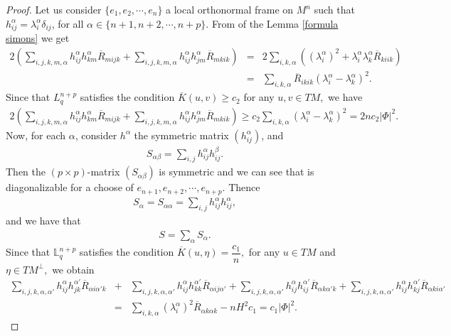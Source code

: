 \documentclass[leqno,11pt]{amsart}
\theoremstyle{plain}
\theoremstyle{definition}
\numberwithin{equation}{section}
\begin{document}
\begin{proof}

Let us consider $\{e_1,e_2,\cdots,e_{n}\}$ a local orthonormal frame on $M^{n}$ such that $h_{ij}^{\alpha}=\lambda_i^{\alpha}\delta_{ij}$, for all $\alpha\in \{n+1,n+2,\cdots,n+p\}.$ From of the Lemma \ref{formula simons} we get
\begin{eqnarray*}
2\left(\sum_{i,j,k,m,\alpha}h_{ij}^{\alpha}h_{km}^{\alpha}\overline{R}_{mijk}+\sum_{i,j,k,m,\alpha}h_{ij}^{\alpha}h_{jm}^{\alpha}\overline{R}_{mkik}\right)
&=&2\sum_{i,k,\alpha}\left((\lambda_{i}^{\alpha})^2+\lambda_i^{\alpha}\lambda_k^{\alpha}\overline{R}_{kiik}\right)\\
&=&\sum_{i,k,\alpha}\overline{R}_{ikik}\left(\lambda_i^{\alpha}-\lambda_k^{\alpha}\right)^2.
\end{eqnarray*}
Since that $L_{q}^{n+p}$ satisfies the condition $\overline{K}(u,v)\geq c_2$ for any $u,v\in TM,$ we have
\begin{eqnarray*}
2\left(\sum_{i,j,k,m,\alpha}h_{ij}^{\alpha}h_{km}^{\alpha}\overline{R}_{mijk}+\sum_{i,j,k,m,\alpha}h_{ij}^{\alpha}h_{jm}^{\alpha}\overline{R}_{mkik}\right)\geq c_2\sum_{i,k,\alpha}(\lambda_i^{\alpha}-\lambda_k^{\alpha})^2=2nc_2|\Phi|^2.
\end{eqnarray*}
Now, for each $\alpha$, consider $h^{\alpha}$ the symmetric matrix $(h_{ij}^{\alpha})$, and 
\begin{eqnarray*}
S_{\alpha\beta}=\sum_{i,j}h_{ij}^{\alpha}h_{ij}^{\beta}.
\end{eqnarray*}
Then the $(p\times p)$-matrix $(S_{\alpha\beta})$ is symmetric and we can see that is diagonalizable for a choose of $e_{n+1},e_{n+2},\cdots,e_{n+p}.$ Thence 
\begin{eqnarray*}
S_{\alpha}=S_{\alpha\alpha}=\sum_{i,j}h_{ij}^{\alpha}h_{ij}^{\alpha},
\end{eqnarray*}
and we have that 
\begin{eqnarray*}
S=\sum_{\alpha}S_{\alpha}.
\end{eqnarray*}
Since that $\mathbb{L}_{q}^{n+p}$ satisfies the condition $\overline{K}(u,\eta)=\dfrac{c_1}{n},$ for any $u\in TM$ and $\eta\in TM^{\perp},$ we obtain
\begin{eqnarray*}
\sum_{i,j,k,\alpha,\alpha'}h_{ij}^{\alpha}h_{jk}^{\alpha'}\overline{R}_{\alpha i\alpha' k}&+&\sum_{i,j,k,\alpha,\alpha'}h_{ij}^{\alpha}h_{kk}^{\alpha'}\overline{R}_{\alpha ij \alpha'}+\sum_{i,j,k,\alpha,\alpha'}h_{ij}^{\alpha}h_{ij}^{\alpha'}\overline{R}_{\alpha k\alpha'k}+\sum_{i,j,k,\alpha,\alpha'}h_{ij}^{\alpha}h_{kj}^{\alpha'}\overline{R}_{\alpha ki \alpha'}\\
&=&\sum_{i,k,\alpha}(\lambda_i^{\alpha})^2\overline{R}_{\alpha k\alpha k}-nH^2c_1
=c_1|\Phi|^2.
\end{eqnarray*}





\end{proof}
\end{document}
